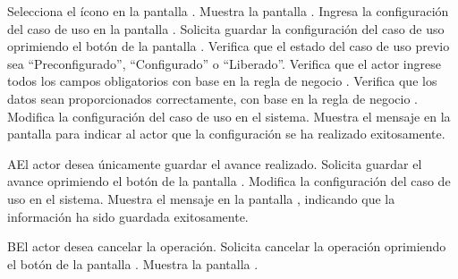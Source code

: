  \begin{UCtrayectoria}
 	\UCpaso[\UCactor] Selecciona el ícono \btnConfigurar en la pantalla .
    \UCpaso[\UCsist] Muestra la pantalla .
    \UCpaso[\UCactor] Ingresa la configuración del caso de uso en la pantalla .\label{cu5.7.2.1:ingresaDatos}
    \UCpaso[\UCactor] Solicita guardar la configuración del caso de uso oprimiendo el botón  de la pantalla .  
    \UCpaso[\UCsist] Verifica que el estado del caso de uso previo sea ``Preconfigurado'', ``Configurado'' o ``Liberado''.  
    \UCpaso[\UCsist] Verifica que el actor ingrese todos los campos obligatorios con base en la regla de negocio  . 
        \UCpaso[\UCsist] Verifica que los datos sean proporcionados correctamente, con base en la regla de negocio .      
    \UCpaso[\UCsist] Modifica la configuración del caso de uso en el sistema.   
    \UCpaso[\UCsist] Muestra el mensaje  en la pantalla  para indicar al actor que la configuración se ha realizado exitosamente.
 \end{UCtrayectoria}
 
 \begin{UCtrayectoriaA}{A}{El actor desea únicamente guardar el avance realizado.}
     \UCpaso[\UCactor] Solicita guardar el avance oprimiendo el botón  de la pantalla .
    \UCpaso[\UCsist] Modifica la configuración del caso de uso en el sistema.   
    \UCpaso[\UCsist] Muestra el mensaje  en la pantalla , indicando que la información ha sido guardada exitosamente.
 \end{UCtrayectoriaA}
 

 \begin{UCtrayectoriaA}{B}{El actor desea cancelar la operación.}
    \UCpaso[\UCactor] Solicita cancelar la operación oprimiendo el botón  de la pantalla .
    \UCpaso[\UCsist] Muestra la pantalla .
 \end{UCtrayectoriaA}
 
